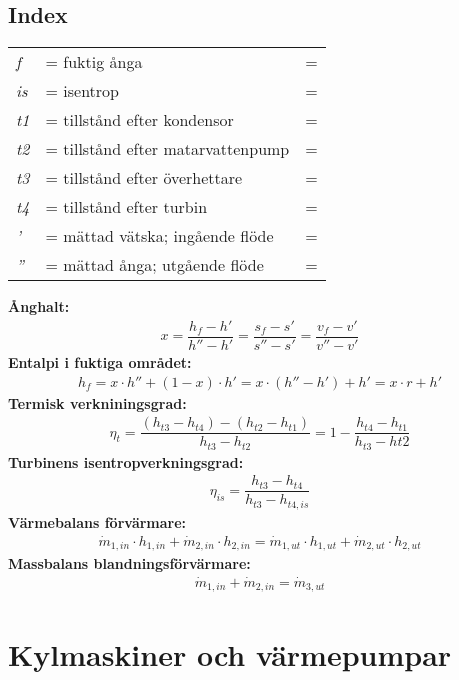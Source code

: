 \subsection*{Index}
	\begin{tabularx}{\linewidth} { l
	>{\raggedright\arraybackslash\hsize=1.5\hsize\linewidth=\hsize}X
	>{\raggedright\arraybackslash\hsize=0.5\hsize\linewidth=\hsize}X}
	\textit{f} & fuktig ånga\\ 
	\textit{is} & isentrop\\ 
	\textit{t1} & tillstånd efter kondensor\\ 
	\textit{t2} & tillstånd efter matarvattenpump\\ 
	\textit{t3} & tillstånd efter överhettare\\ 
	\textit{t4} & tillstånd efter turbin\\ 
	\textit{'} & mättad vätska; ingående flöde\\ 
	\textit{''} & mättad ånga; utgående flöde\\ 
	\end{tabularx}
	\textbf{Ånghalt:}
	\begin{align*}
		x = \dfrac{h_f-h'}{h''-h'} = \dfrac{s_f-s'}{s''-s'} = \dfrac{v_f-v'}{v''-v'}
	\end{align*}
	\textbf{Entalpi i fuktiga området:}
	\begin{align*}
		h_f = x \cdot h'' + (1  - x)  \cdot h' = x \cdot (h'' - h') + h' = x \cdot r + h' 
	\end{align*}
	\textbf{Termisk verkniningsgrad:}
	\begin{align*}
		\eta_t=\dfrac{(h_{t3}-h_{t4})-(h_{t2}-h_{t1})}{h_{t3}-h_{t2}}=1-\dfrac{h_{t4}-h_{t1}}{h_{t3}-h{t2}}
	\end{align*}
	\textbf{Turbinens isentropverkningsgrad:}
	\begin{align*}
		\eta_{is}=\dfrac{h_{t3}-h_{t4}}{h_{t3}-h_{t4,is}}
	\end{align*}
	\textbf{Värmebalans förvärmare:}
	\begin{align*}
		\dot{m}_{1,in}\cdot h_{1,in}+\dot{m}_{2,in}\cdot h_{2,in} = \dot{m}_{1,ut}\cdot h_{1,ut}+\dot{m}_{2,ut}\cdot h_{2,ut}
	\end{align*}
	\textbf{Massbalans blandningsförvärmare:}
	\begin{align*}
		\dot{m}_{1,in}+\dot{m}_{2,in} = \dot{m}_{3,ut}
	\end{align*}
\section*{Kylmaskiner och värmepumpar}
